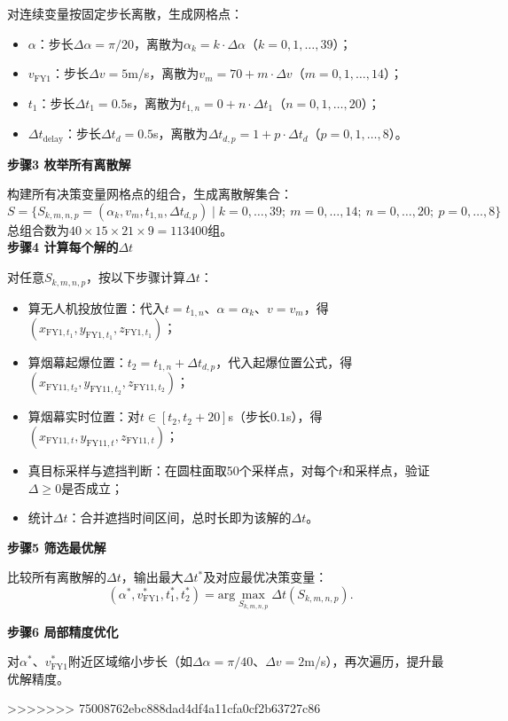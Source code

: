 \documentclass[../main.tex]{subfiles}
\begin{document}
对连续变量按固定步长离散，生成网格点：
\begin{itemize}
    \item $\alpha$：步长$\Delta\alpha=\pi/20$，离散为$\alpha_k=k\cdot\Delta\alpha$（$k=0,1,\dots,39$）；
    \item $v_{\text{FY1}}$：步长$\Delta v=5$m/s，离散为$v_m=70+m\cdot\Delta v$（$m=0,1,\dots,14$）；
    \item $t_1$：步长$\Delta t_1=0.5$s，离散为$t_{1,n}=0+n\cdot\Delta t_1$（$n=0,1,\dots,20$）；
    \item $\Delta t_{\text{delay}}$：步长$\Delta t_d=0.5$s，离散为$\Delta t_{d,p}=1+p\cdot\Delta t_d$（$p=0,1,\dots,8$）。
\end{itemize}

\noindent\textbf{步骤3 枚举所有离散解}

构建所有决策变量网格点的组合，生成离散解集合：
$$S = \{ S_{k,m,n,p}=(\alpha_k, v_m, t_{1,n}, \Delta t_{d,p}) \mid k=0,\dots,39;\ m=0,\dots,14;\ n=0,\dots,20;\ p=0,\dots,8 \}$$
总组合数为$40 \times 15 \times 21 \times 9 = 113400$组。\\[8pt]

\noindent\textbf{步骤4 计算每个解的$\Delta t$}

对任意$S_{k,m,n,p}$，按以下步骤计算$\Delta t$：
\begin{itemize}
    \item 算无人机投放位置：代入$t=t_{1,n}$、$\alpha=\alpha_k$、$v=v_m$，得$(x_{\text{FY1},t_1}, y_{\text{FY1},t_1}, z_{\text{FY1},t_1})$；
    \item 算烟幕起爆位置：$t_2=t_{1,n}+\Delta t_{d,p}$，代入起爆位置公式，得$(x_{\text{FY11},t_2}, y_{\text{FY11},t_2}, z_{\text{FY11},t_2})$；
    \item 算烟幕实时位置：对$t \in [t_2, t_2+20]$s（步长$0.1$s），得$(x_{\text{FY11},t}, y_{\text{FY11},t}, z_{\text{FY11},t})$；
    \item 真目标采样与遮挡判断：在圆柱面取50个采样点，对每个$t$和采样点，验证$\Delta \geq 0$是否成立；
    \item 统计$\Delta t$：合并遮挡时间区间，总时长即为该解的$\Delta t$。
\end{itemize}

\noindent\textbf{步骤5 筛选最优解}

比较所有离散解的$\Delta t$，输出最大$\Delta t^*$及对应最优决策变量：
$$(\alpha^*, v_{\text{FY1}}^*, t_1^*, t_2^*) = \mathrm{arg}\max _{S_{k,m,n,p}} \Delta t(S_{k,m,n,p}).$$

\noindent\textbf{步骤6 局部精度优化}

对$\alpha^*$、$v_{\text{FY1}}^*$附近区域缩小步长（如$\Delta\alpha=\pi/40$、$\Delta v=2$m/s），再次遍历，提升最优解精度。













>>>>>>> 75008762ebc888dad4df4a11cfa0cf2b63727c86
\end{document}
